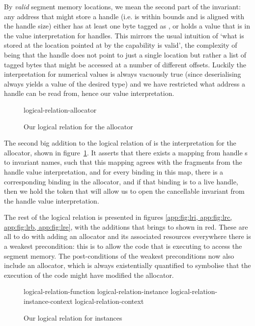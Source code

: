 \documentclass[acmsmall,screen]{acmart}\settopmatter{}
\begin{document}
By \emph{valid} segment memory locations, we mean the second part of the invariant: any address that might store a handle (i.e. is within bounds and is aligned with the handle size) either has at least one byte tagged as \xxWNumeric, or holds a value that is in the value interpretation for handles. This mirrors the usual intuition of `what is stored at the location pointed at by the capability is valid', the complexity of \mswasm being that the handle does not point to just a single location but rather a list of tagged bytes that might be accessed at a number of different offsets. Luckily the interpretation for numerical values is always vacuously true (since deserialising always yields a value of the desired type) and we have restricted what address a handle can be read from, hence our value interpretation.

\begin{figure}[t]
  {logical-relation-allocator}
  \label{app:fig:lra}
  \caption{Our logical relation for the allocator}
\end{figure}

The second big addition to the logical relation of \iriswasm is the interpretation for the allocator, shown in figure~\ref{app:fig:lra}. It asserts that there exists a mapping from handle \xxWid{}s to invariant names, such that this mapping agrees with the fragments from the handle value interpretation, and for every binding in this map, there is a corresponding binding in the allocator, and if that binding is to a live handle, then we hold the token that will allow us to open the cancellable invariant from the handle value interpretation.

The rest of the logical relation is presented in figures \ref{app:fig:lri, app:fig:lrc, app:fig:lrb, app:fig:lre}, with the additions that \irismswasm brings to \iriswasm shown in red. These are all to do with adding an allocator and its associated resources everywhere there is a weakest precondition: this is to allow the code that is executing to access the segment memory. The post-conditions of the weakest preconditions now also include an allocator, which is always existentially quantified to symbolise that the execution of the code might have modified the allocator.

\begin{figure}[t]
  {logical-relation-function}
  {logical-relation-instance}
  {logical-relation-instance-context}
  {logical-relation-context}
\label{app:fig:lri}
\caption{Our logical relation for instances}
\end{figure}
\end{document}
